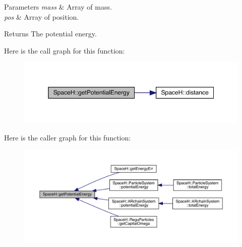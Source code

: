 \begin{DoxyParams}{Parameters}
{\em mass} & Array of mass. \\
\hline
{\em pos} & Array of position. \\
\hline
\end{DoxyParams}
\begin{DoxyReturn}{Returns}
The potential energy. 
\end{DoxyReturn}
Here is the call graph for this function\+:
\nopagebreak
\begin{figure}[H]
\begin{center}
\leavevmode
\includegraphics[width=350pt]{namespace_space_h_aecd56c4b16c8c9e47d4083c52db1640a_cgraph}
\end{center}
\end{figure}
Here is the caller graph for this function\+:
\nopagebreak
\begin{figure}[H]
\begin{center}
\leavevmode
\includegraphics[width=350pt]{namespace_space_h_aecd56c4b16c8c9e47d4083c52db1640a_icgraph}
\end{center}
\end{figure}
\mbox{\label{namespace_space_h_a8796203b0c912b1137302096c8539cda}} 
